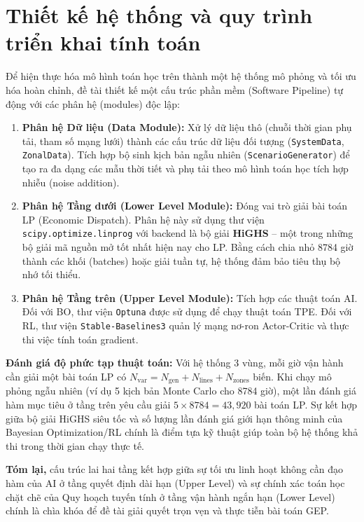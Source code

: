 \section{Thiết kế hệ thống và quy trình triển khai tính toán}

Để hiện thực hóa mô hình toán học trên thành một hệ thống mô phỏng và tối ưu hóa hoàn chỉnh, đề tài thiết kế một cấu trúc phần mềm (Software Pipeline) tự động với các phân hệ (modules) độc lập:

\begin{enumerate}
    \item \textbf{Phân hệ Dữ liệu (Data Module):} Xử lý dữ liệu thô (chuỗi thời gian phụ tải, tham số mạng lưới) thành các cấu trúc dữ liệu đối tượng (\texttt{SystemData}, \texttt{ZonalData}). Tích hợp bộ sinh kịch bản ngẫu nhiên (\texttt{ScenarioGenerator}) để tạo ra đa dạng các mẫu thời tiết và phụ tải theo mô hình toán học tích hợp nhiễu (noise addition).
    \item \textbf{Phân hệ Tầng dưới (Lower Level Module):} Đóng vai trò giải bài toán LP (Economic Dispatch). Phân hệ này sử dụng thư viện \texttt{scipy.optimize.linprog} với backend là bộ giải \textbf{HiGHS} -- một trong những bộ giải mã nguồn mở tốt nhất hiện nay cho LP. Bằng cách chia nhỏ 8784 giờ thành các khối (batches) hoặc giải tuần tự, hệ thống đảm bảo tiêu thụ bộ nhớ tối thiểu.
    \item \textbf{Phân hệ Tầng trên (Upper Level Module):} Tích hợp các thuật toán AI. Đối với BO, thư viện \texttt{Optuna} được sử dụng để chạy thuật toán TPE. Đối với RL, thư viện \texttt{Stable-Baselines3} quản lý mạng nơ-ron Actor-Critic và thực thi việc tính toán gradient.
\end{enumerate}

\textbf{Đánh giá độ phức tạp thuật toán:} Với hệ thống 3 vùng, mỗi giờ vận hành cần giải một bài toán LP có $N_{\text{var}} = N_{\text{gen}} + N_{\text{lines}} + N_{\text{zones}}$ biến. Khi chạy mô phỏng ngẫu nhiên (ví dụ 5 kịch bản Monte Carlo cho 8784 giờ), một lần đánh giá hàm mục tiêu ở tầng trên yêu cầu giải $5 \times 8784 = 43,920$ bài toán LP. Sự kết hợp giữa bộ giải HiGHS siêu tốc và số lượng lần đánh giá giới hạn thông minh của Bayesian Optimization/RL chính là điểm tựa kỹ thuật giúp toàn bộ hệ thống khả thi trong thời gian chạy thực tế.

\vspace{1cm}
\textbf{Tóm lại,} cấu trúc lai hai tầng kết hợp giữa sự tối ưu linh hoạt không cần đạo hàm của AI ở tầng quyết định dài hạn (Upper Level) và sự chính xác toán học chặt chẽ của Quy hoạch tuyến tính ở tầng vận hành ngắn hạn (Lower Level) chính là chìa khóa để đề tài giải quyết trọn vẹn và thực tiễn bài toán GEP.
